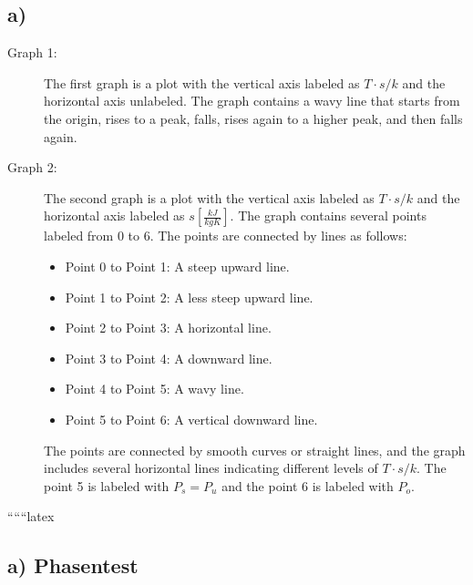 

\subsection*{a)}

\begin{description}
    \item[Graph 1:] The first graph is a plot with the vertical axis labeled as \( T \cdot s/k \) and the horizontal axis unlabeled. The graph contains a wavy line that starts from the origin, rises to a peak, falls, rises again to a higher peak, and then falls again.
    
    \item[Graph 2:] The second graph is a plot with the vertical axis labeled as \( T \cdot s/k \) and the horizontal axis labeled as \( s \left[ \frac{kJ}{kgK} \right] \). The graph contains several points labeled from 0 to 6. The points are connected by lines as follows:
    \begin{itemize}
        \item Point 0 to Point 1: A steep upward line.
        \item Point 1 to Point 2: A less steep upward line.
        \item Point 2 to Point 3: A horizontal line.
        \item Point 3 to Point 4: A downward line.
        \item Point 4 to Point 5: A wavy line.
        \item Point 5 to Point 6: A vertical downward line.
    \end{itemize}
    The points are connected by smooth curves or straight lines, and the graph includes several horizontal lines indicating different levels of \( T \cdot s/k \). The point 5 is labeled with \( P_s = P_u \) and the point 6 is labeled with \( P_o \).
\end{description}

``````latex

\subsection*{a) Phasentest}

